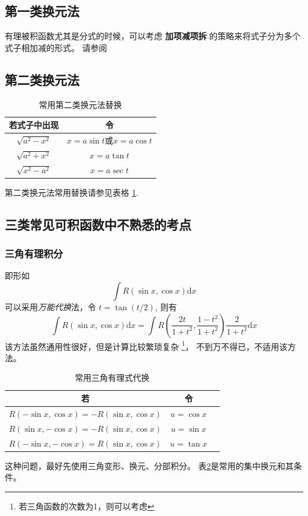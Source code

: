 \subsection{第一类换元法}

有理被积函数尤其是分式的时候，可以考虑 \textbf{加项减项拆}
的策略来将式子分为多个式子相加减的形式。
请参阅\cite[page 98, pdf 109, example 7]{we}

\subsection{第二类换元法}

\begin{table}
    \centering
    \begin{tabular}{cc}
        \toprule
        若式子中出现 & 令 \\
        \midrule
        $\sqrt{a^2 - x^2}$ & $x = a \sin t$或$x = a \cos t$ \\
        $\sqrt{a^2 + x^2}$ & $x = a \tan t$ \\
        $\sqrt{x^2 - a^2}$ & $x = a \sec t$ \\
        \bottomrule
    \end{tabular}
    \caption{常用第二类换元法替换}
    \label{tab:useful-sec-type-substitutions}
\end{table}
第二类换元法常用替换请参见表格 \ref{tab:useful-sec-type-substitutions}.

\subsection{三类常见可积函数中不熟悉的考点}

\subsubsection{三角有理积分}

即形如
\[
    \int R(\sin x, \cos x) \mbox{d} x 
\]
可以采用\textit{万能代换}法，令 $t = \tan (t/2)$, 则有
\begin{equation}
    \int R(\sin x, \cos x) \mbox{d} x 
    = \int R\left(\dfrac{2t}{1+t^2}, \dfrac{1-t^2}{1+t^2}\right) 
    \dfrac{2}{1+t^2} \mbox{d} x
\end{equation}
该方法虽然通用性很好，但是计算比较繁琐复杂
\footnote{若三角函数的次数为1，则可以考虑}，
不到万不得已，不适用该方法。

\begin{table}
    \centering
    \begin{tabular}{ccc}
        \toprule
        若 & 令 \\
        \midrule
        $R(- \sin x,   \cos x) = -R(\sin x, \cos x)$ & $u = \cos x$ \\
        $R(  \sin x, - \cos x) = -R(\sin x, \cos x)$ & $u = \sin x$ \\
        $R(- \sin x, - \cos x) =  R(\sin x, \cos x)$ & $u = \tan x$ \\
        \bottomrule
    \end{tabular}
    \caption{常用三角有理式代换}
    \label{tab:useful-tri-rational-substitutions}
\end{table}
这种问题，最好先使用三角变形、换元、分部积分。
表\ref{tab:useful-tri-rational-substitutions}是常用的集中换元和其条件。

